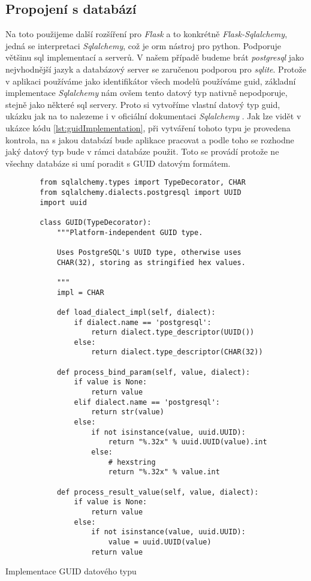 \subsection{Propojení s databází}

Na toto použijeme další rozšíření pro \textit{Flask} a to konkrétně \textit{Flask-Sqlalchemy}, jedná se interpretaci \textit{Sqlalchemy}, což je \gls{orm} nástroj pro python.
Podporuje většinu \gls{sql} implementací a serverů. V našem případě budeme brát \textit{postgresql} jako nejvhodnější jazyk a databázový server se zaručenou podporou pro \textit{sqlite}. Protože
v aplikaci používáme jako identifikátor všech modelů používáme \gls{guid}, základní implementace \textit{Sqlalchemy} nám ovšem tento datový typ nativně nepodporuje, stejně jako
některé \gls{sql} servery. Proto si vytvoříme vlastní datový typ \gls{guid}, ukázku jak na to nalezeme i v oficiální dokumentaci \textit{Sqlalchemy} \cite{sqlalchemyGuid}. Jak lze
vidět v ukázce kódu \ref{lst:guidImplementation}, při vytváření tohoto typu je provedena kontrola, na s jakou databází bude aplikace pracovat a podle toho se rozhodne jaký datový typ
bude v rámci databáze použit. Toto se provádí protože ne všechny databáze si umí poradit s GUID datovým formátem.

\begin{listing}
    \begin{verbatim}
        from sqlalchemy.types import TypeDecorator, CHAR
        from sqlalchemy.dialects.postgresql import UUID
        import uuid

        class GUID(TypeDecorator):
            """Platform-independent GUID type.

            Uses PostgreSQL's UUID type, otherwise uses
            CHAR(32), storing as stringified hex values.

            """
            impl = CHAR

            def load_dialect_impl(self, dialect):
                if dialect.name == 'postgresql':
                    return dialect.type_descriptor(UUID())
                else:
                    return dialect.type_descriptor(CHAR(32))

            def process_bind_param(self, value, dialect):
                if value is None:
                    return value
                elif dialect.name == 'postgresql':
                    return str(value)
                else:
                    if not isinstance(value, uuid.UUID):
                        return "%.32x" % uuid.UUID(value).int
                    else:
                        # hexstring
                        return "%.32x" % value.int

            def process_result_value(self, value, dialect):
                if value is None:
                    return value
                else:
                    if not isinstance(value, uuid.UUID):
                        value = uuid.UUID(value)
                    return value
    \end{verbatim}
    \caption{Implementace GUID datového typu}
    \label{lst:guidImplementation}
\end{listing}

